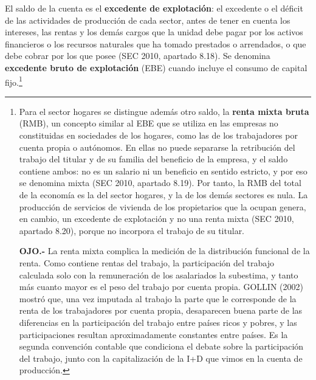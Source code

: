 \documentclass[10pt,a4paper]{article}
\begin{document}
El saldo de la cuenta es el \textbf{excedente de explotación}: el excedente o el déficit de las actividades de producción de cada sector, antes de tener en cuenta los intereses, las rentas y los demás cargos que la unidad debe pagar por los activos financieros o los recursos naturales que ha tomado prestados o arrendados, o que debe cobrar por los que posee (SEC 2010, apartado 8.18). Se denomina \textbf{excedente bruto de explotación} (EBE) cuando incluye el consumo de capital fijo.\footnote{%
    Para el sector hogares se distingue además otro saldo, la \textbf{renta mixta bruta} (RMB), un concepto similar al EBE que se utiliza en las empresas no constituidas en sociedades de los hogares, como las de los trabajadores por cuenta propia o autónomos. En ellas no puede separarse la retribución del trabajo del titular y de su familia del beneficio de la empresa, y el saldo contiene ambos: no es un salario ni un beneficio en sentido estricto, y por eso se denomina mixta (SEC 2010, apartado 8.19). Por tanto, la RMB del total de la economía es la del sector hogares, y la de los demás sectores es nula. La producción de servicios de vivienda de los propietarios que la ocupan genera, en cambio, un excedente de explotación y no una renta mixta (SEC 2010, apartado 8.20), porque no incorpora el trabajo de su titular.

    \textbf{OJO.-} La renta mixta complica la medición de la distribución funcional de la renta. Como contiene rentas del trabajo, la participación del trabajo calculada solo con la remuneración de los asalariados la subestima, y tanto más cuanto mayor es el peso del trabajo por cuenta propia. GOLLIN (2002) mostró que, una vez imputada al trabajo la parte que le corresponde de la renta de los trabajadores por cuenta propia, desaparecen buena parte de las diferencias en la participación del trabajo entre países ricos y pobres, y las participaciones resultan aproximadamente constantes entre países. Es la segunda convención contable que condiciona el debate sobre la participación del trabajo, junto con la capitalización de la I+D que vimos en la cuenta de producción.
}
\end{document}
